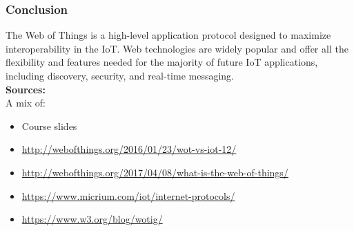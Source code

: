 \subsubsection{Conclusion}

The Web of Things is a high-level application protocol designed to maximize
interoperability in the IoT. Web technologies are widely popular and offer all
the flexibility and features needed for the majority of future IoT
applications, including discovery, security, and real-time messaging.\\

\textbf{Sources:}\\

A mix of:

\begin{itemize}
  \item Course slides
  \item \url{http://webofthings.org/2016/01/23/wot-vs-iot-12/}
  \item \url{http://webofthings.org/2017/04/08/what-is-the-web-of-things/}
  \item \url{https://www.micrium.com/iot/internet-protocols/}
  \item \url{https://www.w3.org/blog/wotig/}
\end{itemize}
